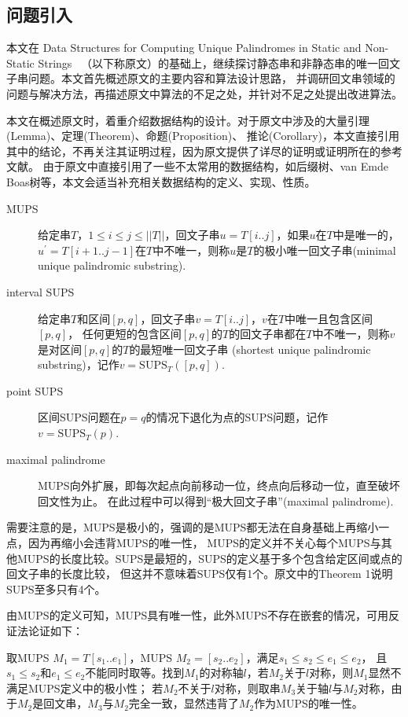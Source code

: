 \subsection{问题引入}\label{subsec:intro}

本文在 Data Structures for Computing Unique Palindromes in Static and Non-Static Strings~\cite{Mieno2024}
（以下称原文）的基础上，继续探讨静态串和非静态串的唯一回文子串问题。本文首先概述原文的主要内容和算法设计思路，
并调研回文串领域的问题与解决方法，再描述原文中算法的不足之处，并针对不足之处提出改进算法。

本文在概述原文时，着重介绍数据结构的设计。对于原文中涉及的大量引理(Lemma)、定理(Theorem)、命题(Proposition)、
推论(Corollary)，本文直接引用其中的结论，不再关注其证明过程，因为原文提供了详尽的证明或证明所在的参考文献。
由于原文中直接引用了一些不太常用的数据结构，如后缀树、van Emde Boas树等，本文会适当补充相关数据结构的定义、实现、性质。

\begin{description}
    \item [MUPS] 给定串$T$，$1 \leq i \leq j \leq ||T||$，回文子串$u = T[i..j]$，如果$u$在$T$中是唯一的，
    $u^{\prime} = T[i + 1..j - 1]$在$T$中不唯一，则称$u$是$T$的极小唯一回文子串(minimal unique palindromic substring).
    \item [interval SUPS] 给定串$T$和区间$[p,q]$，回文子串$v = T[i..j]$，$v$在$T$中唯一且包含区间$[p,q]$，
    任何更短的包含区间$[p,q]$的$T$的回文子串都在$T$中不唯一，则称$v$是对区间$[p,q]$的$T$的最短唯一回文子串
    (shortest unique palindromic substring)，记作$v = \mathrm{SUPS}_T ([p,q])$.
    \item[point SUPS] 区间SUPS问题在$p = q$的情况下退化为点的SUPS问题，记作$v = \mathrm{SUPS}_T (p)$.
    \item[maximal palindrome] MUPS向外扩展，即每次起点向前移动一位，终点向后移动一位，直至破坏回文性为止。
    在此过程中可以得到“极大回文子串”(maximal palindrome).
\end{description}

需要注意的是，MUPS是极小的，强调的是MUPS都无法在自身基础上再缩小一点，因为再缩小会违背MUPS的唯一性，
MUPS的定义并不关心每个MUPS与其他MUPS的长度比较。SUPS是最短的，SUPS的定义基于多个包含给定区间或点的回文子串的长度比较，
但这并不意味着SUPS仅有1个。原文中的Theorem 1说明SUPS至多只有4个。

由MUPS的定义可知，MUPS具有唯一性，此外MUPS不存在嵌套的情况，可用反证法论证如下：

取MUPS $M_1 = T[s_1..e_1]$，MUPS $M_2 = [s_2..e_2]$，满足$s_1 \leq s_2 \leq e_1 \leq e_2 $，
且$s_1 \leq s_2$和$e_1 \leq e_2$不能同时取等。找到$M_1$的对称轴$l$，若$M_2$关于$l$对称，则$M_1$显然不满足MUPS定义中的极小性；
若$M_2$不关于$l$对称，则取串$M_3$关于轴$l$与$M_2$对称，由于$M_2$是回文串，$M_3$与$M_2$完全一致，显然违背了$M_2$作为MUPS的唯一性。


